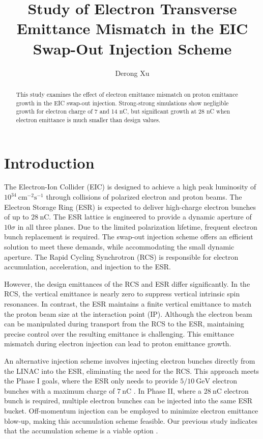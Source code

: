 \documentclass{article}
\title{Study of Electron Transverse Emittance Mismatch in the EIC Swap-Out Injection Scheme}
\author{Derong Xu}
\begin{document}
\maketitle

\begin{abstract}
This study examines the effect of electron emittance mismatch 
on proton emittance growth in the EIC swap-out injection. 
Strong-strong simulations show negligible growth for electron 
charge of 7 and 14 nC, but significant growth at 28 nC 
when electron emittance is much smaller than design values.
\end{abstract}
\section{Introduction}
The Electron-Ion Collider (EIC) is designed to achieve a high peak luminosity of 
$10^{34}~\mathrm{cm}^{-2}\mathrm{s}^{-1}$ through collisions of polarized electron and 
proton beams. The Electron Storage Ring (ESR) is expected to 
deliver high-charge electron bunches of up to $28~\mathrm{nC}$.
The ESR lattice is engineered to provide a dynamic aperture of $10\sigma$ in all three 
planes. Due to the limited polarization lifetime, frequent electron bunch replacement 
is required. The swap-out injection scheme offers an efficient solution to meet these 
demands, while accommodating the small dynamic aperture. The Rapid Cycling Synchrotron 
(RCS) is responsible for electron accumulation, acceleration, and injection to the ESR.

However, the design emittances of the RCS and ESR differ significantly. 
In the RCS, the vertical emittance is nearly zero to suppress vertical intrinsic 
spin resonances. In contrast, the ESR maintains a finite vertical emittance to 
match the proton beam size at the interaction point (IP). 
Although the electron beam can be manipulated during transport from the RCS to 
the ESR, maintaining precise control over the resulting emittance is challenging.
This emittance mismatch during electron injection can lead to proton emittance growth.

An alternative injection scheme involves injecting electron bunches directly from the 
LINAC into the ESR, eliminating the need for the RCS. This approach meets the Phase I 
goals, where the ESR only needs to provide $5/10~\mathrm{GeV}$ electron bunches with 
a maximum charge of $7~\mathrm{nC}$ \cite{EICMACReview202409:Sergei} . In Phase II, where a $28~\mathrm{nC}$ electron 
bunch is required, multiple electron bunches can be injected into the same ESR bucket. 
Off-momentum injection can be employed to minimize electron emittance blow-up, 
making this accumulation scheme feasible. Our previous study indicates that 
the accumulation scheme is a viable option \cite{xu:ipac2024-mopc72}.
\end{document}
